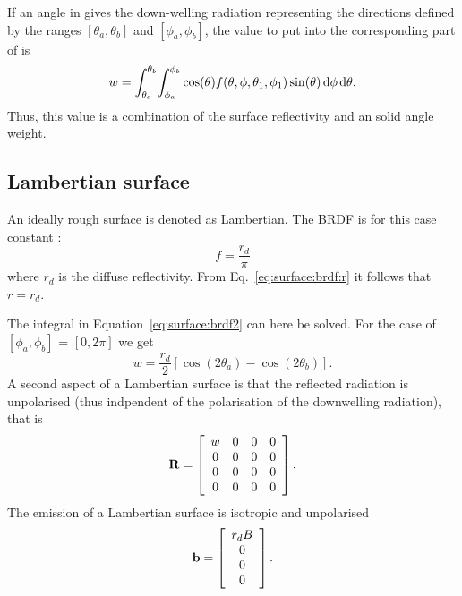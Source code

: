 If an angle in  gives the down-welling radiation
representing the directions defined by the ranges $[\theta_a,\theta_b]$ and
$[\phi_a,\phi_b]$, the value to put into the corresponding part of
 is
\begin{equation}
  \label{eq:surface:brdf2}
  w = \int_{\theta_a}^{\theta_b} \! \int_{\phi_a}^{\phi_b} 
  \cos(\theta) f(\theta,\phi,\theta_1,\phi_1)
  \sin(\theta) \, \mathrm{d}\phi \, \mathrm{d}\theta.
\end{equation}
Thus, this value is a combination of the surface reflectivity and an solid
angle weight.


\subsection{Lambertian surface}
\label{sec:surface:rough:lambertian}
An ideally rough surface is denoted as Lambertian. The BRDF is for this case
constant \citep[e.g.][]{petty:06}:
\begin{equation}
  \label{eq:surface:lambertian1}
  f = \frac{r_d}{\pi}
\end{equation}
where $r_d$ is the diffuse reflectivity. From Eq.~\ref{eq:surface:brdf:r} it 
follows that $r = r_d$.

The integral in Equation~\ref{eq:surface:brdf2} can here be solved. For the
case of $[\phi_a,\phi_b]$ = $[0,2\pi]$ we get
\begin{equation}
  \label{eq:surface:lambertian1}
  w = \frac{r_d}{2}\left[\cos(2\theta_a)-\cos(2\theta_b)\right].
\end{equation}
A second aspect of a Lambertian surface is that the reflected radiation is
unpolarised (thus indpendent of the polarisation of the downwelling radiation),
that is 
\begin{equation}
  \label{eq:surface:lambertian_matrix}
  \mathbf{R} =
     \left[\begin{array}{cccc}
       w&0&0&0\\
       0&0&0&0\\
       0&0&0&0\\
       0&0&0&0\\
     \end{array}
     \right].
\end{equation}
The emission of a Lambertian surface is isotropic and unpolarised
\begin{equation}
  \label{eq:surface:blambertian} 
  \mathbf{b} =  \left[\begin{array}{c} r_dB \\ 0 \\0\\0 \end{array}\right].
\end{equation}



